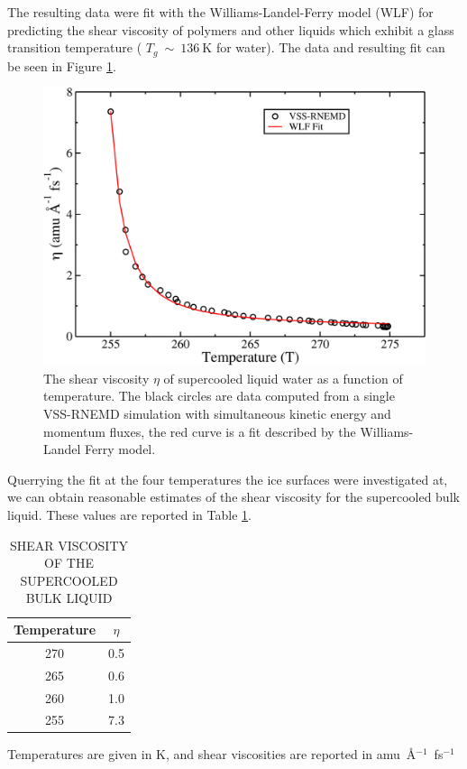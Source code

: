 The resulting data were fit with the Williams-Landel-Ferry model (WLF)
for predicting the shear viscosity of polymers and other liquids which
exhibit a glass transition temperature ( $T_g~\sim~136~\mathrm{K}$ for
water). The data and resulting fit can be seen in Figure
\ref{fig:etaT}. 
\begin{figure}
\includegraphics[width=\linewidth]{Figures/etaT}
\caption{\label{fig:etaT} The shear viscosity $\eta$ of supercooled
  liquid water as a function of temperature. The black circles are
  data computed from a single VSS-RNEMD simulation with simultaneous
  kinetic energy and momentum fluxes, the red curve is a fit described
  by the Williams-Landel Ferry model.}
\end{figure} 
Querrying the fit at the four temperatures the ice surfaces were
investigated at, we can obtain reasonable estimates of the shear
viscosity for the supercooled bulk liquid. These values are reported
in Table \ref{tab:bulkVisco}.
   

\begin{table}[h] \centering \caption{SHEAR VISCOSITY OF THE
    SUPERCOOLED BULK LIQUID\label{tab:bulkVisco}}
\begin{tabular}{cc}
\hline
\hline
 Temperature & $\eta$ \\
\hline
270 & 0.5 \\
265 & 0.6 \\
260 & 1.0  \\
255 & 7.3 \\
\hline
\hline
\end{tabular}
\begin{flushleft}
  Temperatures are given in K, and shear viscosities are reported in
  amu~\AA$^{-1}$~fs$^{-1}$
\end{flushleft}
\end{table}


